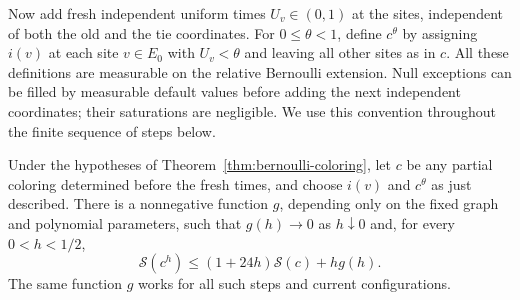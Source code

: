 Now add fresh independent uniform times $U_v\in(0,1)$ at the sites,
independent of both the old and the tie coordinates.  For $0\leq\theta<1$,
define $c^\theta$ by assigning $i(v)$ at each site $v\in E_0$ with
$U_v<\theta$ and leaving all other sites as in $c$.  All these definitions
are measurable on the relative Bernoulli extension.  Null exceptions can
be filled by measurable default values before adding the next independent
coordinates; their saturations are negligible.  We use this convention
throughout the finite sequence of steps below.

\begin{lemma}
\label{lem:hazard-step}
Under the hypotheses of Theorem~\ref{thm:bernoulli-coloring}, let $c$ be
any partial coloring determined before the fresh times, and choose
$i(v)$ and $c^\theta$ as just described.  There is a nonnegative function
$g$, depending only on the fixed graph and polynomial parameters, such
that $g(h)\to0$ as $h\downarrow0$ and, for every $0<h<1/2$,
\begin{equation}
 \mathcal S(c^h)
      \leq(1+24h)\mathcal S(c)+h g(h).
 \label{eq:coloring-step-bound}
\end{equation}
The same function $g$ works for all such steps and current configurations.
\end{lemma}

